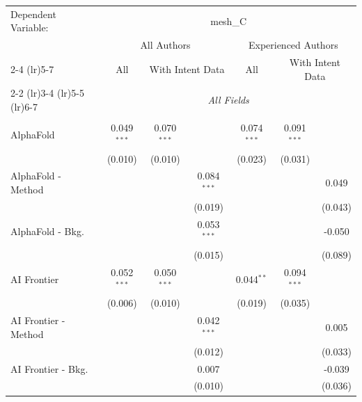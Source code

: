 \begingroup
\centering
\begin{tabular}{lcccccc}
   \tabularnewline \midrule \midrule
   Dependent Variable: & \multicolumn{6}{c}{mesh\_C}\\
 & \multicolumn{3}{c}{All Authors} & \multicolumn{3}{c}{Experienced Authors} \\
\cmidrule(lr){2-4} \cmidrule(lr){5-7}
 & \multicolumn{1}{c}{All} & \multicolumn{2}{c}{With Intent Data} & \multicolumn{1}{c}{All} & \multicolumn{2}{c}{With Intent Data} \\
\cmidrule(lr){2-2} \cmidrule(lr){3-4} \cmidrule(lr){5-5} \cmidrule(lr){6-7}
 & \multicolumn{6}{c}{\textit{All Fields}} \\ \\
   AlphaFold            & 0.049$^{***}$ & 0.070$^{***}$ &               & 0.074$^{***}$ & 0.091$^{***}$  &   \\   
                        & (0.010)       & (0.010)       &               & (0.023)       & (0.031)        &   \\   
   AlphaFold - Method   &               &               & 0.084$^{***}$ &               &                & 0.049\\   
                        &               &               & (0.019)       &               &                & (0.043)\\   
   AlphaFold - Bkg.     &               &               & 0.053$^{***}$ &               &                & -0.050\\   
                        &               &               & (0.015)       &               &                & (0.089)\\   
   AI Frontier          & 0.052$^{***}$ & 0.050$^{***}$ &               & 0.044$^{**}$  & 0.094$^{***}$  &   \\   
                        & (0.006)       & (0.010)       &               & (0.019)       & (0.035)        &   \\   
   AI Frontier - Method &               &               & 0.042$^{***}$ &               &                & 0.005\\   
                        &               &               & (0.012)       &               &                & (0.033)\\   
   AI Frontier - Bkg.   &               &               & 0.007         &               &                & -0.039\\   
                        &               &               & (0.010)       &               &                & (0.036)\\   

\end{tabular}
